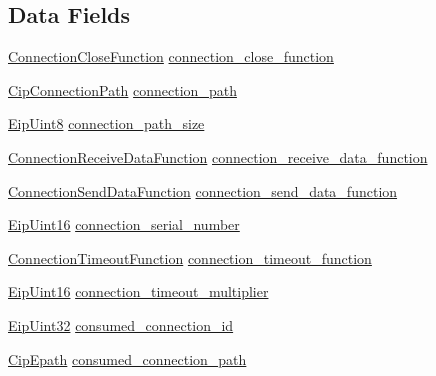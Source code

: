 \subsection*{\-Data \-Fields}
\begin{DoxyCompactItemize}
\item 
\hyperlink{group__CIP__API_ga754f77d4872724e212cf1d9d7d84d406}{\-Connection\-Close\-Function} \hyperlink{structconnection__object_a51af396f09a2874cecd1d463c85e2a34}{connection\-\_\-close\-\_\-function}
\item 
\hyperlink{structCipConnectionPath}{\-Cip\-Connection\-Path} \hyperlink{structconnection__object_a7ea92b8fc46bb305035ed3547516e0a7}{connection\-\_\-path}
\item 
\hyperlink{typedefs_8h_aa0c108ee762a27720919a4634643040e}{\-Eip\-Uint8} \hyperlink{structconnection__object_aaab602a6e09d625e3057e5d1ca8825e5}{connection\-\_\-path\-\_\-size}
\item 
\hyperlink{group__CIP__API_gaac5ac35ed35317f29e3455e92f450623}{\-Connection\-Receive\-Data\-Function} \hyperlink{structconnection__object_af885b8e00c36002715d9cbb32b56f3a2}{connection\-\_\-receive\-\_\-data\-\_\-function}
\item 
\hyperlink{group__CIP__API_gaa870412e93039a338e73edc08e9cd68a}{\-Connection\-Send\-Data\-Function} \hyperlink{structconnection__object_ab54770913f007d4ca02e10835352649d}{connection\-\_\-send\-\_\-data\-\_\-function}
\item 
\hyperlink{typedefs_8h_ac1b4cfa25b4f5def62f23b455dd395d8}{\-Eip\-Uint16} \hyperlink{structconnection__object_ad769130c9d4e6725c5be513a3d54e1fe}{connection\-\_\-serial\-\_\-number}
\item 
\hyperlink{group__CIP__API_gaffa28b7ae343af7c7d1c7c52d83bbbee}{\-Connection\-Timeout\-Function} \hyperlink{structconnection__object_a1188e39b93ec13c5dca2c1c56d6ab07e}{connection\-\_\-timeout\-\_\-function}
\item 
\hyperlink{typedefs_8h_ac1b4cfa25b4f5def62f23b455dd395d8}{\-Eip\-Uint16} \hyperlink{structconnection__object_abc7006673b2cb7a9139d1bf209293773}{connection\-\_\-timeout\-\_\-multiplier}
\item 
\hyperlink{typedefs_8h_abf2dd49262551294eb990ef8746a2767}{\-Eip\-Uint32} \hyperlink{structconnection__object_a762ab498e7e93c55f9f5a442b014094f}{consumed\-\_\-connection\-\_\-id}
\item 
\hyperlink{structCipEpath}{\-Cip\-Epath} \hyperlink{structconnection__object_ab3ad0cdf7a707fb8554f0c2705999122}{consumed\-\_\-connection\-\_\-path}
\item 

\end{DoxyCompactItemize}
